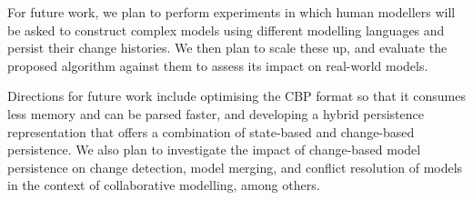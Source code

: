 \documentclass{llncs}
\begin{document}
For future work, we plan to perform experiments in which human modellers will be asked to construct complex models using different modelling languages and persist their change histories. We then plan to scale these up, and evaluate the proposed algorithm against them to assess its impact on real-world models.

Directions for future work include optimising the CBP format so that it consumes less memory and can be parsed faster, and developing a hybrid persistence representation that offers a combination of state-based and change-based persistence. We also plan to investigate the impact of change-based model persistence on change detection, model merging, and conflict resolution of models in the context of collaborative modelling, among others.

 

\end{document}
